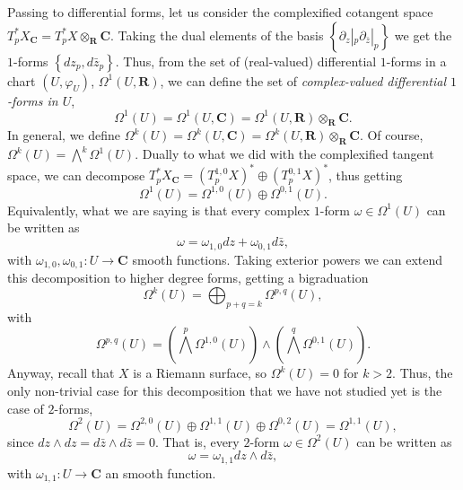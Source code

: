\documentclass[12pt,a4paper]{book}
\theoremstyle{definition} \newtheorem{defn}[thm]{Definition}
\theoremstyle{definition} \newtheorem{ejemplo}[thm]{Example}
\theoremstyle{definition} \newtheorem{ejercicio}[thm]{Exercise}
\theoremstyle{remark} \newtheorem*{obs}{Remark}
\def\CC{\mathbf{C}}
\def\RR{\mathbf{R}}
\begin{document}
Passing to differential forms, let us consider the complexified cotangent space $T^*_p X_\CC = T^*_pX \otimes_\RR \CC$. Taking the dual elements of the basis $\left\{ \partial_z|_p \partial_{\bar{z}}|_p \right\}$ we get the $1$-forms $\left\{ dz_p, d\bar{z}_p \right\}$. Thus, from the set of (real-valued) differential $1$-forms in a chart $(U,\varphi_U)$, $\Omega^1(U,\RR)$, we can define the set of \emph{complex-valued differential $1$-forms in $U$}, 
\begin{equation*}
  \Omega^1(U)=\Omega^1(U,\CC)=\Omega^1(U,\RR) \otimes_\RR \CC.
\end{equation*}
In general, we define $\Omega^k(U)=\Omega^k(U,\CC) = \Omega^k(U,\RR) \otimes_\RR \CC$. Of course, $\Omega^k(U)=\bigwedge^k \Omega^1(U)$.
Dually to what we did with the complexified tangent space, we can decompose $T_p^*X_\CC = (T_p^{1,0}X)^* \oplus (T_p^{0,1}X)^*$, thus getting
\begin{equation*}
  \Omega^1(U)= \Omega^{1,0}(U) \oplus \Omega^{0,1}(U).
\end{equation*}
Equivalently, what we are saying is that every complex $1$-form $\omega \in \Omega^1(U)$ can be written as
\begin{equation*}
  \omega = \omega_{1,0} dz + \omega_{0,1} d\bar{z},
\end{equation*}
with $\omega_{1,0}, \omega_{0,1} : U \rightarrow \CC$ smooth functions.
Taking exterior powers we can extend this decomposition to higher degree forms, getting a bigraduation
\begin{equation*}
  \Omega^k(U)=\bigoplus_{p+q=k}\Omega^{p,q}(U),
\end{equation*}
with
\begin{equation*}
  \Omega^{p,q}(U)=\left( \bigwedge^p \Omega^{1,0}(U) \right) \wedge \left( \bigwedge^q \Omega^{0,1}(U) \right).
\end{equation*}
Anyway, recall that $X$ is a Riemann surface, so $\Omega^k(U)=0$ for $k>2$. Thus, the only non-trivial case for this decomposition that we have not studied yet is the case of $2$-forms,
\begin{equation*}
  \Omega^2(U)=\Omega^{2,0}(U) \oplus \Omega^{1,1}(U) \oplus \Omega^{0,2}(U)=\Omega^{1,1}(U),
\end{equation*}
since $dz\wedge dz = d\bar{z} \wedge d\bar{z} =0$.
That is, every $2$-form $\omega\in \Omega^2(U)$ can be written as
\begin{equation*}
  \omega = \omega_{1,1} dz \wedge d\bar{z},
\end{equation*}
with $\omega_{1,1}: U \rightarrow \CC$ an smooth function.
\end{document}
